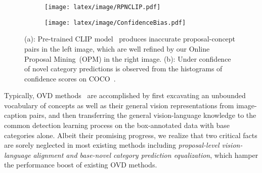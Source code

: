 \documentclass[10pt,twocolumn,letterpaper]{article}
\begin{document}
\begin{figure}[!t]
    \centering
    \begin{subfigure}[b]{0.43\textwidth}
         \centering
         \texttt{[image: latex/image/RPNCLIP.pdf]}
         \caption{}
         \label{fig:proposal_problem}
    \end{subfigure}
\begin{subfigure}[b]{0.43\textwidth}
         \centering
         \texttt{[image: latex/image/ConfidenceBias.pdf]}
         \caption{}
         \label{fig:confidence_biase}
    \end{subfigure}
    \vspace{-1.0em}
    \caption{
    (a): Pre-trained CLIP model~\cite{clip} produces inaccurate proposal-concept pairs in the left image, which are well refined by our Online Proposal Mining~(OPM) in the right image.
    (b): Under confidence of novel category predictions is observed from the histograms of confidence scores on COCO~\cite{coco_zeroshot}.
}
    \vspace{-1.5em}
    \label{fig:teaser}
\end{figure}




Typically, OVD methods~\cite{ovrcnn, vild,regionCLIP,detic} are accomplished by first excavating an unbounded vocabulary of concepts as well as their general vision representations from image-caption pairs, and then transferring the general vision-language knowledge 
to the common detection learning process on the box-annotated data with base categories alone.
Albeit their promising progress, we realize that two critical facts are sorely neglected in most existing methods including \textit{proposal-level vision-language alignment and base-novel category prediction equalization}, 
which hamper the performance boost of existing OVD methods.
\end{document}
